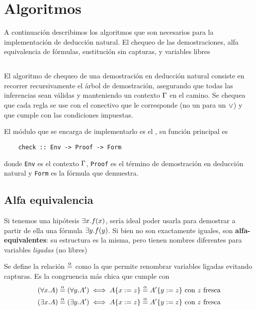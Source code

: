 \section{Algoritmos}

A continuación describimos los algoritmos que son necesarios para la implementación de deducción natural. El chequeo de las demostraciones, alfa equivalencia de fórmulas, sustitución sin capturas, y variables libres

\subsection{}
\label{nd:sec:checker}

El algoritmo de chequeo de una demostración en deducción natural consiste en recorrer recursivamente el árbol de demostración, asegurando que todas las inferencias sean válidas y manteniendo un contexto $\Gamma$ en el camino.
Se chequea que cada regla se use con el conectivo que le corresponde (no un  para un $\vee$) y que cumple con las condiciones impuestas.

El módulo que se encarga de implementarlo es el \modChecker, su función principal es

\begin{verbatim}
    check :: Env -> Proof -> Form
\end{verbatim}

donde \texttt{Env} es el contexto $\Gamma$, \texttt{Proof} es el término de demostración en deducción natural y \texttt{Form} es la fórmula que demuestra.

\subsection{Alfa equivalencia}

Si tenemos una hipótesis $\exists x . f(x)$, sería ideal poder usarla para demostrar a partir de ella una fórmula $\exists y . f(y)$. Si bien no son exactamente iguales, son \textbf{alfa-equivalentes}: su estructura es la misma, pero tienen nombres diferentes para variables \textit{ligadas} (no libres)

\begin{definition} Se define la relación $\overset{\alpha}{=}$ como la que permite renombrar variables ligadas evitando capturas. Es la congruencia más chica que cumple con
\begin{align*}
    (\forall x . A) \overset{\alpha}{=} (\forall y . A')
        &\iff
        A \{x := z\} \overset{\alpha}{=}
        A' \{y := z\} \text{ con $z$ fresca}
        \\
    (\exists x . A) \overset{\alpha}{=} (\exists y . A')
        &\iff
        A \{x := z\} \overset{\alpha}{=}
        A' \{y := z\} \text{ con $z$ fresca}
        \\
\end{align*}
\end{definition}

